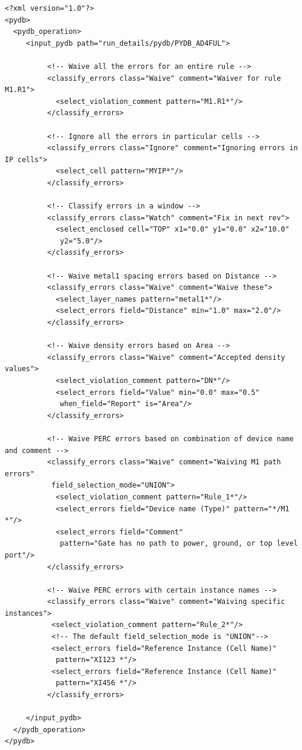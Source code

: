 \begin{lstlisting}[style=shell,caption={常见 Waiver 场景},label={ex:common-waiver-xml}]
<?xml version="1.0"?>
<pydb>
  <pydb_operation>
     <input_pydb path="run_details/pydb/PYDB_AD4FUL">

          <!-- Waive all the errors for an entire rule -->
          <classify_errors class="Waive" comment="Waiver for rule M1.R1">
            <select_violation_comment pattern="M1.R1*"/>
          </classify_errors>

          <!-- Ignore all the errors in particular cells -->
          <classify_errors class="Ignore" comment="Ignoring errors in IP cells">
            <select_cell pattern="MYIP*"/>
          </classify_errors>

          <!-- Classify errors in a window -->
          <classify_errors class="Watch" comment="Fix in next rev">
            <select_enclosed cell="TOP" x1="0.0" y1="0.0" x2="10.0"
             y2="5.0"/>
          </classify_errors>

          <!-- Waive metal1 spacing errors based on Distance -->
          <classify_errors class="Waive" comment="Waive these">
            <select_layer_names pattern="metal1*"/>
            <select_errors field="Distance" min="1.0" max="2.0"/>
          </classify_errors>

          <!-- Waive density errors based on Area -->
          <classify_errors class="Waive" comment="Accepted density values">
            <select_violation_comment pattern="DN*"/>
            <select_errors field="Value" min="0.0" max="0.5"
             when_field="Report" is="Area"/>
          </classify_errors>

          <!-- Waive PERC errors based on combination of device name and comment -->
          <classify_errors class="Waive" comment="Waiving M1 path errors"
           field_selection_mode="UNION">
            <select_violation_comment pattern="Rule_1*"/>
            <select_errors field="Device name (Type)" pattern="*/M1 *"/>
            <select_errors field="Comment"
             pattern="Gate has no path to power, ground, or top level port"/>
          </classify_errors>

          <!-- Waive PERC errors with certain instance names -->
          <classify_errors class="Waive" comment="Waiving specific instances">
           <select_violation_comment pattern="Rule_2*"/>
           <!-- The default field_selection_mode is "UNION"-->
           <select_errors field="Reference Instance (Cell Name)"
            pattern="XI123 *"/>
           <select_errors field="Reference Instance (Cell Name)"
            pattern="XI456 *"/>
          </classify_errors>

     </input_pydb>
  </pydb_operation>
</pydb>
\end{lstlisting}


